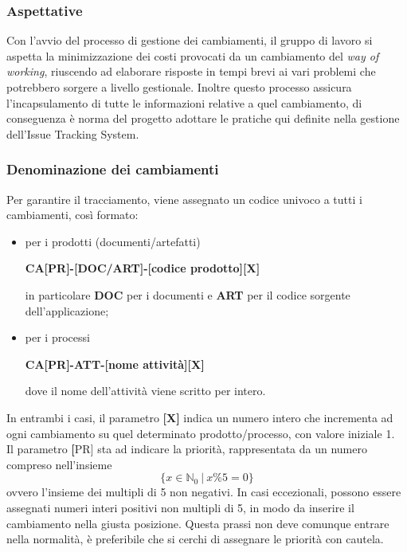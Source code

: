\subsubsection{Aspettative}
Con l'avvio del processo di gestione dei cambiamenti, il gruppo di lavoro si aspetta la minimizzazione dei costi provocati da un cambiamento
del \textit{way of working}, riuscendo ad elaborare risposte in tempi brevi ai vari problemi che potrebbero sorgere a livello gestionale.
Inoltre questo processo assicura l'incapsulamento di tutte le informazioni relative a quel cambiamento, di conseguenza è norma del progetto adottare le 
pratiche qui definite nella gestione dell'Issue Tracking System.

\subsubsection{Denominazione dei cambiamenti}
Per garantire il tracciamento, viene assegnato un codice univoco a tutti i cambiamenti, così formato:
\begin{itemize}
    \item per i prodotti (documenti/artefatti)
          \begin{center}
              \textbf{CA[PR]-[DOC/ART]-[codice prodotto][X]}
          \end{center}
          in particolare \textbf{DOC} per i documenti e \textbf{ART} per il codice sorgente dell'applicazione;
    \item per i processi
          \begin{center}
              \textbf{CA[PR]-ATT-[nome attività][X]}
          \end{center}
          dove il nome dell'attività viene scritto per intero.
\end{itemize}
In entrambi i casi, il parametro \textbf{[X]} indica un numero intero che incrementa ad ogni cambiamento su quel determinato prodotto/processo,
con valore iniziale 1.\\
Il parametro \textbf[PR] sta ad indicare la priorità, rappresentata da un numero compreso nell'insieme
\[\{x \in \mathbb{N}_0 \ | \  x \% 5 = 0 \} \]
ovvero l'insieme dei multipli di 5 non negativi. In casi eccezionali, possono essere assegnati numeri interi positivi non multipli di 5,
in modo da inserire il cambiamento nella giusta posizione. Questa prassi non deve comunque entrare nella normalità,  è preferibile che si cerchi
di assegnare le priorità con cautela.

